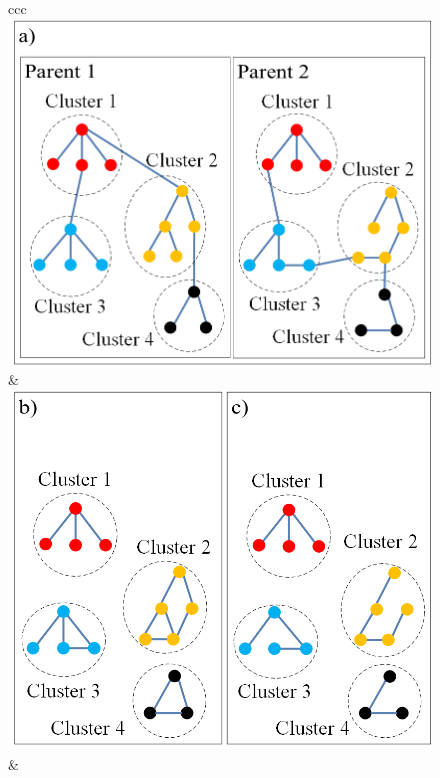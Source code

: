 \renewcommand{\scalefigure}{0.2}
\begin{figure}[tb]
	\centering	
	\setlength\tabcolsep{0 pt}
	\begin{tabular}{ccc}
		\renewcommand{\scalefigure}{0.203}
		\includegraphics[scale=\scalefigure]{Pictures/Crossover/Crossover_New_a.png} &
		\renewcommand{\scalefigure}{0.20} 	
		\includegraphics[scale=\scalefigure]{Pictures/Crossover/Crossover_New_b_c.png} &  

\end{tabular}
\end{figure}
